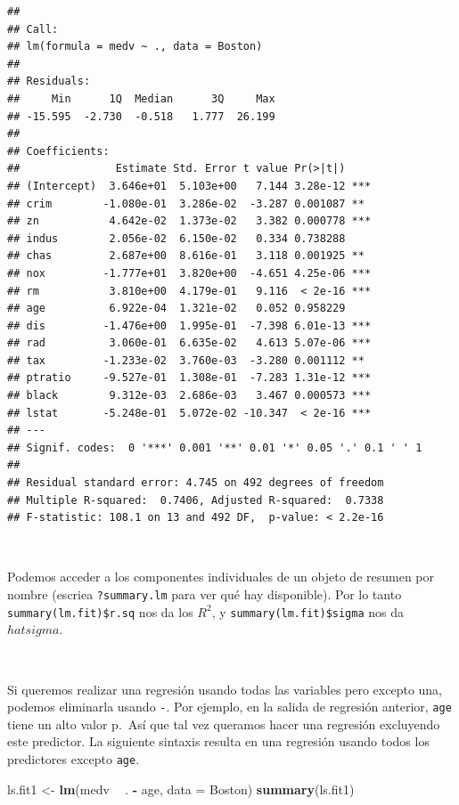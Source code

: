 \documentclass[]{book}
\newenvironment{Shaded}{\begin{snugshade}}{\end{snugshade}}
\newcommand{\KeywordTok}[1]{\textcolor[rgb]{0.13,0.29,0.53}{\textbf{#1}}}
\newcommand{\DataTypeTok}[1]{\textcolor[rgb]{0.13,0.29,0.53}{#1}}
\newcommand{\StringTok}[1]{\textcolor[rgb]{0.31,0.60,0.02}{#1}}
\newcommand{\OperatorTok}[1]{\textcolor[rgb]{0.81,0.36,0.00}{\textbf{#1}}}
\newcommand{\NormalTok}[1]{#1}
\begin{document}
\begin{verbatim}
## 
## Call:
## lm(formula = medv ~ ., data = Boston)
## 
## Residuals:
##     Min      1Q  Median      3Q     Max 
## -15.595  -2.730  -0.518   1.777  26.199 
## 
## Coefficients:
##               Estimate Std. Error t value Pr(>|t|)    
## (Intercept)  3.646e+01  5.103e+00   7.144 3.28e-12 ***
## crim        -1.080e-01  3.286e-02  -3.287 0.001087 ** 
## zn           4.642e-02  1.373e-02   3.382 0.000778 ***
## indus        2.056e-02  6.150e-02   0.334 0.738288    
## chas         2.687e+00  8.616e-01   3.118 0.001925 ** 
## nox         -1.777e+01  3.820e+00  -4.651 4.25e-06 ***
## rm           3.810e+00  4.179e-01   9.116  < 2e-16 ***
## age          6.922e-04  1.321e-02   0.052 0.958229    
## dis         -1.476e+00  1.995e-01  -7.398 6.01e-13 ***
## rad          3.060e-01  6.635e-02   4.613 5.07e-06 ***
## tax         -1.233e-02  3.760e-03  -3.280 0.001112 ** 
## ptratio     -9.527e-01  1.308e-01  -7.283 1.31e-12 ***
## black        9.312e-03  2.686e-03   3.467 0.000573 ***
## lstat       -5.248e-01  5.072e-02 -10.347  < 2e-16 ***
## ---
## Signif. codes:  0 '***' 0.001 '**' 0.01 '*' 0.05 '.' 0.1 ' ' 1
## 
## Residual standard error: 4.745 on 492 degrees of freedom
## Multiple R-squared:  0.7406, Adjusted R-squared:  0.7338 
## F-statistic: 108.1 on 13 and 492 DF,  p-value: < 2.2e-16
\end{verbatim}

~

Podemos acceder a los componentes individuales de un objeto de resumen
por nombre (escriea \texttt{?summary.lm} para ver qué hay disponible).
Por lo tanto \texttt{summary(lm.fit)\$r.sq} nos da los \(R^2\), y
\texttt{summary(lm.fit)\$sigma} nos da \(hat{sigma}\).

~

Si queremos realizar una regresión usando todas las variables pero
excepto una, podemos eliminarla usando \texttt{-}. Por ejemplo, en la
salida de regresión anterior, \texttt{age} tiene un alto valor p.~Así
que tal vez queramos hacer una regresión excluyendo este predictor. La
siguiente sintaxis resulta en una regresión usando todos los predictores
excepto \texttt{age}.

\begin{Shaded}
\begin{Highlighting}[]
\NormalTok{ls.fit1 <-}\StringTok{ }\KeywordTok{lm}\NormalTok{(medv }\OperatorTok{~}\StringTok{ }\NormalTok{. }\OperatorTok{-}\StringTok{ }\NormalTok{age, }\DataTypeTok{data =}\NormalTok{ Boston)}
\KeywordTok{summary}\NormalTok{(ls.fit1)}
\end{Highlighting}
\end{Shaded}
\end{document}
